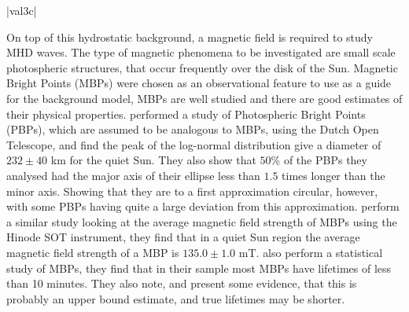 \py[chapter3]|val3c|

On top of this hydrostatic background, a magnetic field is required to study MHD waves.
The type of magnetic phenomena to be investigated are small scale photospheric structures, that occur frequently over the disk of the Sun.
Magnetic Bright Points (MBPs) were chosen as an observational feature to use as a guide for the background model, MBPs are well studied and there are good estimates of their physical properties.
\cite{feng2013} performed a study of Photospheric Bright Points (PBPs), which are assumed to be analogous to MBPs, using the Dutch Open Telescope, and find the peak of the log-normal distribution give a diameter of $232\pm40$ km for the quiet Sun.
They also show that $50$\% of the PBPs they analysed had the major axis of their ellipse less than $1.5$ times longer than the minor axis.
Showing that they are to a first approximation circular, however, with some PBPs having quite a large deviation from this approximation.
\cite{utz2013} perform a similar study looking at the average magnetic field strength of MBPs using the Hinode SOT instrument, they find that in a quiet Sun region the average magnetic field strength of a MBP is $135.0 \pm 1.0$ mT.
\cite{sanchezalmeida2004} also perform a statistical study of MBPs, they find that in their sample most MBPs have lifetimes of less than 10 minutes.
They also note, and present some evidence, that this is probably an upper bound estimate, and true lifetimes may be shorter.


